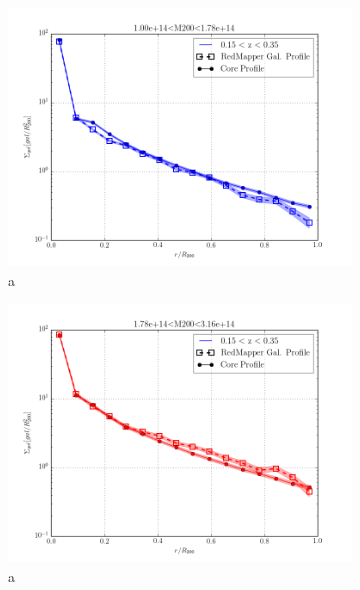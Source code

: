 \documentclass[twocolumn]{article}
\begin{document}
\begin{figure}
  \begin{subfigure}{.5\textwidth}
    \centering\includegraphics[width=1.0\linewidth]{figs/cfn/basic_rm.param/plot_zmrs.py/fig2.png}
    \caption{a}
  \end{subfigure}
  \begin{subfigure}{.5\textwidth}
    \centering\includegraphics[width=1.0\linewidth]{figs/cfn/basic_rm.param/plot_zmrs.py/fig3.png}
    \caption{a}
  \end{subfigure}
  \begin{subfigure}{.5\textwidth}

\end{subfigure}
\end{figure}
\end{document}

